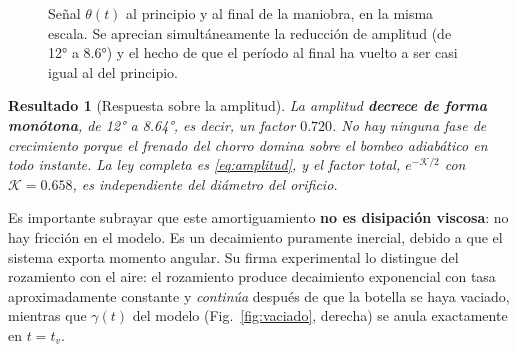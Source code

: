 \documentclass[11pt,a4paper]{article}
\newtheorem{resultado}{Resultado}
\begin{document}
\begin{figure}[H]
\centering
{}
\hfill
{}
\caption{Señal $\theta(t)$ al principio y al final de la maniobra, en la misma escala. Se aprecian
simultáneamente la reducción de amplitud (de \ang{12} a \ang{8.6}) y el hecho de que el período
al final ha vuelto a ser casi igual al del principio.}
\label{fig:traza}
\end{figure}

\begin{resultado}[Respuesta sobre la amplitud]
La amplitud \textbf{decrece de forma monótona}, de \ang{12} a \ang{8.64}, es decir, un factor
$0.720$. No hay ninguna fase de crecimiento porque el frenado del chorro domina sobre el bombeo
adiabático en todo instante. La ley completa es \eqref{eq:amplitud}, y el factor total,
$e^{-\mathcal{K}/2}$ con $\mathcal K = 0.658$, es independiente del diámetro del orificio.
\end{resultado}

\medskip
\noindent
Es importante subrayar que este amortiguamiento \textbf{no es disipación viscosa}: no hay fricción
en el modelo. Es un decaimiento puramente inercial, debido a que el sistema exporta momento
angular. Su firma experimental lo distingue del rozamiento con el aire: el rozamiento produce
decaimiento exponencial con tasa aproximadamente constante y \emph{continúa} después de que la
botella se haya vaciado, mientras que $\gamma(t)$ del modelo (Fig.~\ref{fig:vaciado}, derecha) se
anula exactamente en $t=t_v$.

\end{document}
